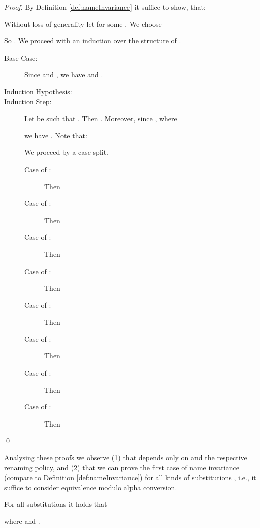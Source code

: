\documentclass[]{llncs}
\begin{document}
\begin{proof}
	By Definition \ref{def:nameInvariance} it suffice to show, that:
	
	Without loss of generality let  for some . We choose
	
	So . We proceed with an induction over the structure of .
	\begin{description}
		\item[Base Case:] Since  and , we have  and .
		\item[Induction Hypothesis:] 
		\item[Induction Step:] Let  be such that . Then . Moreover, since , where
			
			we have . Note that:
			
			We proceed by a case split.
			\begin{description}
				\item[Case of :] Then
					
				\item[Case of :] Then
					
				\item[Case of :] Then
					
				\item[Case of :] Then
					
				\item[Case of :] Then
					
				\item[Case of :] Then
					
				\item[Case of :] Then
					
				\item[Case of :] Then
					{\allowdisplaybreaks
					}
			\end{description}
	\end{description}
	\qed
\end{proof}

Analysing these proofs we observe (1) that  depends only on  and the respective renaming policy, and (2) that we can prove the first case of name invariance (compare to Definition \ref{def:nameInvariance}) for all kinds of substitutions , i.e., it suffice to consider equivalence modulo alpha conversion.

\begin{corollary} \label{col:encodingSubstitutions}
	For all substitutions  it holds that
	
	where  and .
\end{corollary}
\end{document}
